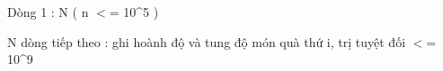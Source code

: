 Dòng 1 : N ( n $<$= 10\textasciicircum5 )

N dòng tiếp theo : ghi hoành độ và tung độ món quà thứ i, trị tuyệt đối $<$= 10\textasciicircum9